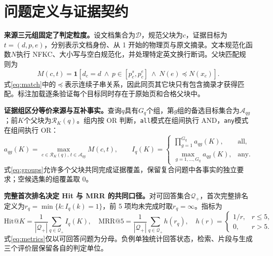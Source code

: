 \section{问题定义与证据契约}

\textbf{来源三元组固定了判定粒度。}设文档集合为\(\mathcal D\)，规范父块为\(c\)，证据目标为\(t=(d,p,e)\)，分别表示文档身份、从 1 开始的物理页与原文摘录。文本规范化函数\(N\)执行 NFKC、大小写与空白规范化，并处理特定英文换行断词。父块匹配规则为
\begin{equation}
M(c,t)=\mathbf1\!\left[d_c=d\ \land\ p\in[p_c^{s},p_c^{e}]\ \land\ N(e)\preceq N(x_c)\right].
\label{eq:match}
\end{equation}
式\eqref{eq:match}中的\(\preceq\)表示连续子串关系，因此同页其它块只有包含摘录才获得匹配。标注加载逐条验证每个目标同时存在于原始页和合格父块中。

\textbf{证据组区分等价来源与互补事实。}查询\(q\)具有\(G_q\)个组，第\(g\)组的备选目标集合为\(\mathcal A_{qg}\)；前\(K\)个父块为\(\mathcal R_K(q)\)。组内按 OR 判断，\texttt{all}模式在组间执行 AND，\texttt{any}模式在组间执行 OR：
\begin{equation}
a_{qg}(K)=\max_{c\in\mathcal R_K(q),\,t\in\mathcal A_{qg}}M(c,t),\qquad
I_q(K)=\begin{cases}\prod_{g=1}^{G_q}a_{qg}(K),&\text{all},\\\max_{g=1,\ldots,G_q}a_{qg}(K),&\text{any}.\end{cases}
\label{eq:groups}
\end{equation}
式\eqref{eq:groups}允许多个父块共同完成证据覆盖，保留复合问题中各事实的独立要求；空候选集的组覆盖取 0。

\textbf{完整首次排名决定 Hit 与 MRR 的共同口径。}对可回答集合\(\mathcal Q_+\)，首次完整排名定义为\(r_q=\min\{k:I_q(k)=1\}\)，前 5 项均未完成时取\(r_q=\infty\)。指标为
\begin{equation}
\mathrm{Hit@}K=\frac{1}{|\mathcal Q_+|}\sum_{q\in\mathcal Q_+}I_q(K),\quad
\mathrm{MRR@5}=\frac{1}{|\mathcal Q_+|}\sum_{q\in\mathcal Q_+}h(r_q),\quad
h(r)=\begin{cases}1/r,&r\le5,\\0,&r>5.\end{cases}
\label{eq:metrics}
\end{equation}
式\eqref{eq:metrics}仅以可回答问题为分母。负例单独统计回答状态，检索、片段与生成三个评价层保留各自的判定单位。
